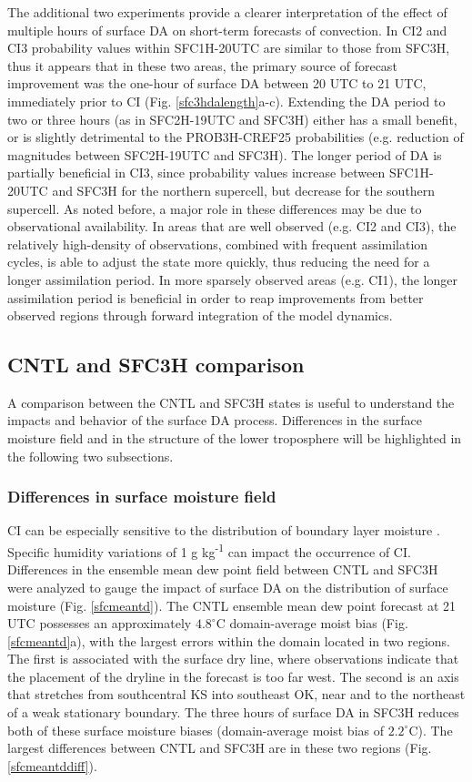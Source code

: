The additional two experiments provide a clearer interpretation of the effect of multiple hours of surface DA on short-term forecasts of convection. In CI2 and CI3 probability values within SFC1H-20UTC are similar to those from SFC3H, thus it appears that in these two areas, the primary source of forecast improvement was the one-hour of surface DA between 20 UTC to 21 UTC, immediately prior to CI (Fig. \ref{sfc3hdalength}a-c). Extending the DA period to two or three hours (as in SFC2H-19UTC and SFC3H) either has a small benefit, or is slightly detrimental to the PROB3H-CREF25 probabilities (e.g. reduction of magnitudes between SFC2H-19UTC and SFC3H). The longer period of DA is partially beneficial in CI3, since probability values increase between SFC1H-20UTC and SFC3H for the northern supercell, but decrease for the southern supercell. As noted before, a major role in these differences may be due to observational availability. In areas that are well observed (e.g. CI2 and CI3), the relatively high-density of observations, combined with frequent assimilation cycles, is able to adjust the state more quickly, thus reducing the need for a longer assimilation period. In more sparsely observed areas (e.g. CI1), the longer assimilation period is beneficial in order to reap improvements from better observed regions through forward integration of the model dynamics.

\subsection{CNTL and SFC3H comparison}
A comparison between the CNTL and SFC3H states is useful to understand the impacts and behavior of the surface DA process. Differences in the surface moisture field and in the structure of the lower troposphere will be highlighted in the following two subsections.

\subsubsection{Differences in surface moisture field}
\label{tdsection}
CI can be especially sensitive to the distribution of boundary layer moisture \citep{crook96,weckwerth00}. Specific humidity variations of 1 g kg\textsuperscript{-1} can impact the occurrence of CI. Differences in the ensemble mean dew point field between CNTL and SFC3H were analyzed to gauge the impact of surface DA on the distribution of surface moisture (Fig. \ref{sfcmeantd}). The CNTL ensemble mean dew point forecast at 21 UTC possesses an approximately \(4.8^{\circ}\)C domain-average moist bias (Fig. \ref{sfcmeantd}a), with the largest errors within the domain located in two regions. The first is associated with the surface dry line, where observations indicate that the placement of the dryline in the forecast is too far west. The second is an axis that stretches from southcentral KS into southeast OK, near and to the northeast of a weak stationary boundary. The three hours of surface DA in SFC3H reduces both of these surface moisture biases (domain-average moist bias of \(2.2^{\circ}\)C). The largest differences between CNTL and SFC3H are in these two regions (Fig. \ref{sfcmeantddiff}).

